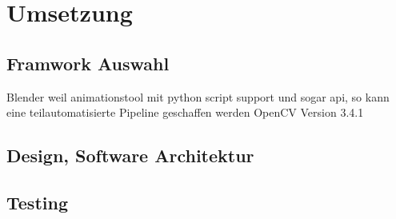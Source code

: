 \chapter{Umsetzung}
\section{Framwork Auswahl}
Blender weil animationstool mit python script support und sogar api, so kann eine teilautomatisierte Pipeline geschaffen werden
OpenCV Version 3.4.1
\section{Design, Software Architektur}
\section{Testing}